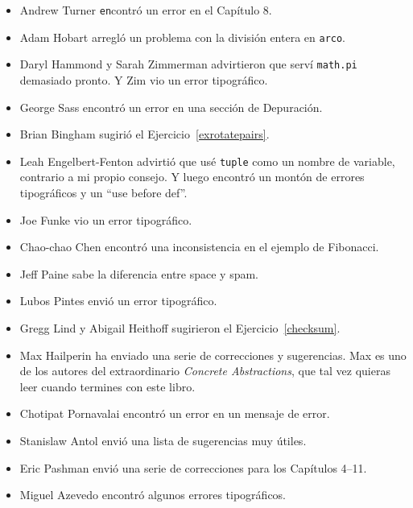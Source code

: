 \documentclass[10pt]{book}
\begin{document}
\begin{itemize}
\item Andrew Turner {\tt en}contró un error en el Capítulo 8.

\item Adam Hobart arregló un problema con la división entera en {\tt arco}.

\item Daryl Hammond y Sarah Zimmerman advirtieron que serví
{\tt math.pi} demasiado pronto.  Y Zim vio un error tipográfico.

\item George Sass encontró un error en una sección de Depuración.

\item Brian Bingham sugirió el Ejercicio~\ref{exrotatepairs}.

\item Leah Engelbert-Fenton advirtió que usé {\tt tuple}
como un nombre de variable, contrario a mi propio consejo.  Y luego encontró
un montón de errores tipográficos y un ``use before def''.

\item Joe Funke vio un error tipográfico.

\item Chao-chao Chen encontró una inconsistencia en el ejemplo de Fibonacci.

\item Jeff Paine sabe la diferencia entre space y spam.

\item Lubos Pintes envió un error tipográfico.

\item Gregg Lind y Abigail Heithoff sugirieron el Ejercicio~\ref{checksum}.

\item Max Hailperin ha enviado una serie de correcciones y
  sugerencias.  Max es uno de los autores del extraordinario {\em
    Concrete Abstractions}, que tal vez quieras leer cuando termines
  con este libro.

\item Chotipat Pornavalai encontró un error en un mensaje de error.

\item Stanislaw Antol envió una lista de sugerencias muy útiles.

\item Eric Pashman envió una serie de correcciones para los Capítulos 4--11.

\item Miguel Azevedo encontró algunos errores tipográficos.


\end{itemize}
\end{document}

